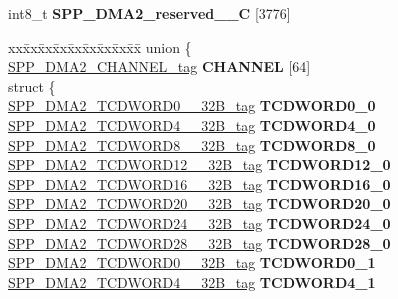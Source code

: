 \begin{DoxyCompactItemize}
\begin{tabbing}
\end{tabbing}\item 
\mbox{\label{structSPP__DMA2__struct__tag_af72e63c798f946282f94c10ac1072f86}} 
int8\+\_\+t {\bfseries S\+P\+P\+\_\+\+D\+M\+A2\+\_\+reserved\+\_\+\_\+C} \mbox{[}3776\mbox{]}
\item 
\mbox{\label{structSPP__DMA2__struct__tag_a6006023c5d5d2f9c7d00a4a27015dfc5}} 
\begin{tabbing}
xx\=xx\=xx\=xx\=xx\=xx\=xx\=xx\=xx\=\kill
union \{\\
\>\mbox{\hyperlink{structSPP__DMA2__CHANNEL__struct__tag}{SPP\_DMA2\_CHANNEL\_tag}} {\bfseries CHANNEL} \mbox{[}64\mbox{]}\\
\mbox{\label{unionSPP__DMA2__struct__tag_1_1_0D2265_a888901120afba7232a65df000a34c014}} 
\>struct \{\\
\>\>\mbox{\hyperlink{unionSPP__DMA2__TCDWORD0____32B__tag}{SPP\_DMA2\_TCDWORD0\_\_32B\_tag}} {\bfseries TCDWORD0\_0}\\
\>\>\mbox{\hyperlink{unionSPP__DMA2__TCDWORD4____32B__tag}{SPP\_DMA2\_TCDWORD4\_\_32B\_tag}} {\bfseries TCDWORD4\_0}\\
\>\>\mbox{\hyperlink{unionSPP__DMA2__TCDWORD8____32B__tag}{SPP\_DMA2\_TCDWORD8\_\_32B\_tag}} {\bfseries TCDWORD8\_0}\\
\>\>\mbox{\hyperlink{unionSPP__DMA2__TCDWORD12____32B__tag}{SPP\_DMA2\_TCDWORD12\_\_32B\_tag}} {\bfseries TCDWORD12\_0}\\
\>\>\mbox{\hyperlink{unionSPP__DMA2__TCDWORD16____32B__tag}{SPP\_DMA2\_TCDWORD16\_\_32B\_tag}} {\bfseries TCDWORD16\_0}\\
\>\>\mbox{\hyperlink{unionSPP__DMA2__TCDWORD20____32B__tag}{SPP\_DMA2\_TCDWORD20\_\_32B\_tag}} {\bfseries TCDWORD20\_0}\\
\>\>\mbox{\hyperlink{unionSPP__DMA2__TCDWORD24____32B__tag}{SPP\_DMA2\_TCDWORD24\_\_32B\_tag}} {\bfseries TCDWORD24\_0}\\
\>\>\mbox{\hyperlink{unionSPP__DMA2__TCDWORD28____32B__tag}{SPP\_DMA2\_TCDWORD28\_\_32B\_tag}} {\bfseries TCDWORD28\_0}\\
\>\>\mbox{\hyperlink{unionSPP__DMA2__TCDWORD0____32B__tag}{SPP\_DMA2\_TCDWORD0\_\_32B\_tag}} {\bfseries TCDWORD0\_1}\\
\>\>\mbox{\hyperlink{unionSPP__DMA2__TCDWORD4____32B__tag}{SPP\_DMA2\_TCDWORD4\_\_32B\_tag}} {\bfseries TCDWORD4\_1}\\

\end{tabbing}
\end{DoxyCompactItemize}
